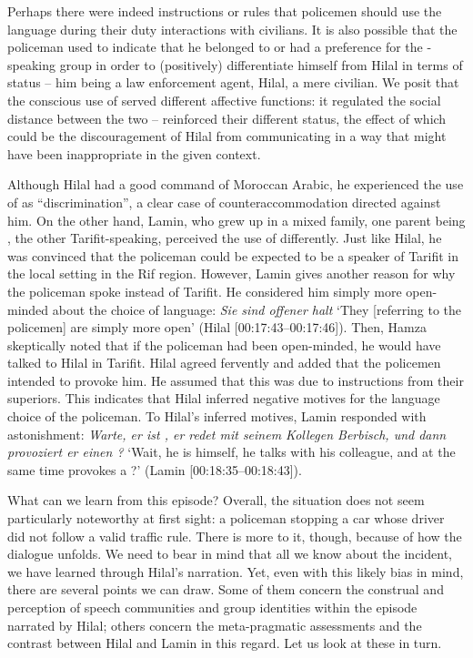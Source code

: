 \documentclass[output=paper,colorlinks,citecolor=brown]{langscibook}
\begin{document}
Perhaps there were indeed instructions or rules that policemen should use the  language during their duty interactions with civilians. It is also possible that the policeman used  to indicate that he belonged to or had a preference for the -speaking group in order to (positively) differentiate himself from Hilal in terms of status -- him being a law enforcement agent, Hilal, a mere civilian. We posit that the conscious use of  served different affective functions: it regulated the social distance between the two --  reinforced their different status, the effect of which could be the discouragement of Hilal from communicating in a way that might have been inappropriate in the given context. 

Although Hilal had a good command of Moroccan Arabic, he experienced the use of  as ``discrimination'', a clear case of counteraccommodation directed against him. On the other hand, Lamin, who grew up in a mixed family, one parent being , the other Tarifit-speaking, perceived the use of  differently. Just like Hilal, he was convinced that the policeman could be expected to be a speaker of Tarifit in the local setting in the Rif region. However, Lamin gives another reason for why the policeman spoke  instead of Tarifit. He considered him simply more open-minded about the choice of language: \textit{Sie sind offener halt} `They [referring to the policemen] are simply more open' (Hilal [00:17:43--00:17:46]). Then, Hamza skeptically noted that if the policeman had been open-minded, he would have talked to Hilal in Tarifit. Hilal agreed fervently and added that the policemen intended to provoke him. He assumed that this was due to instructions from their superiors. This indicates that Hilal inferred negative motives for the language choice of the policeman. To Hilal's inferred motives, Lamin responded with astonishment: \textit{Warte, er ist , er redet mit seinem Kollegen Berbisch, und dann provoziert er einen ?} `Wait, he is  himself, he talks  with his colleague, and at the same time provokes a ?' (Lamin [00:18:35--00:18:43]).

What can we learn from this episode? Overall, the situation does not seem particularly noteworthy at first sight: a policeman stopping a car whose driver did not follow a valid traffic rule. There is more to it, though, because of how the dialogue unfolds. We need to bear in mind that all we know about the incident, we have learned through Hilal's narration. Yet, even with this likely bias in mind, there are several points we can draw. Some of them concern the construal and perception of speech communities and group identities within the episode narrated by Hilal; others concern the meta-pragmatic assessments and the contrast between Hilal and Lamin in this regard. Let us look at these in turn.
\end{document}
